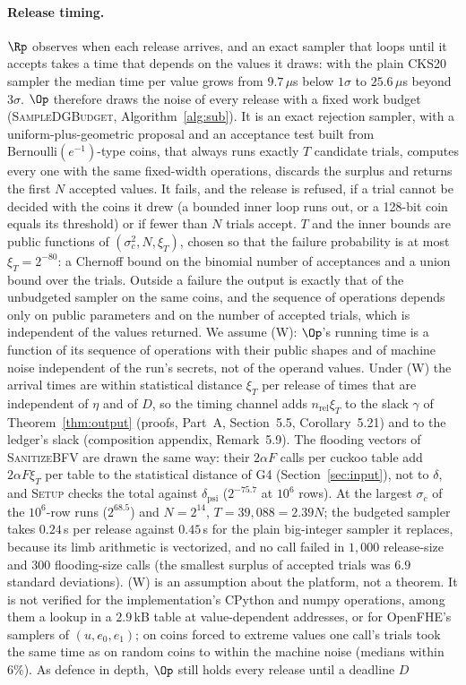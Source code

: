 \paragraph{Release timing.} $\Rp$ observes when each release arrives, and an exact sampler that loops until it accepts takes a time that depends on the values it draws: with the plain CKS20 sampler the median time per value grows from $9.7\,\mu$s below $1\sigma$ to $25.6\,\mu$s beyond $3\sigma$. $\Op$ therefore draws the noise of every release with a fixed work budget (\textsc{SampleDGBudget}, Algorithm~\ref{alg:sub}). It is an exact rejection sampler, with a uniform-plus-geometric proposal and an acceptance test built from $\mathrm{Bernoulli}(e^{-1})$-type coins, that always runs exactly $T$ candidate trials, computes every one with the same fixed-width operations, discards the surplus and returns the first $N$ accepted values. It fails, and the release is refused, if a trial cannot be decided with the coins it drew (a bounded inner loop runs out, or a 128-bit coin equals its threshold) or if fewer than $N$ trials accept. $T$ and the inner bounds are public functions of $(\sigma_c^2, N, \xi_T)$, chosen so that the failure probability is at most $\xi_T = 2^{-80}$: a Chernoff bound on the binomial number of acceptances and a union bound over the trials. Outside a failure the output is exactly that of the unbudgeted sampler on the same coins, and the sequence of operations depends only on public parameters and on the number of accepted trials, which is independent of the values returned. We assume (W): $\Op$'s running time is a function of its sequence of operations with their public shapes and of machine noise independent of the run's secrets, not of the operand values. Under (W) the arrival times are within statistical distance $\xi_T$ per release of times that are independent of $\eta$ and of $D$, so the timing channel adds $n_{\mathrm{rel}}\xi_T$ to the slack $\gamma$ of Theorem~\ref{thm:output} (proofs, Part~A, Section~5.5, Corollary~5.21) and to the ledger's slack (composition appendix, Remark~5.9). The flooding vectors of \textsc{SanitizeBFV} are drawn the same way: their $2\alpha F$ calls per cuckoo table add $2\alpha F\xi_T$ per table to the statistical distance of G4 (Section~\ref{sec:input}), not to $\delta$, and \textsc{Setup} checks the total against $\delta_{\mathrm{psi}}$ ($2^{-75.7}$ at $10^6$ rows). At the largest $\sigma_c$ of the $10^6$-row runs ($2^{68.5}$) and $N = 2^{14}$, $T = 39{,}088 = 2.39N$; the budgeted sampler takes $0.24$\,s per release against $0.45$\,s for the plain big-integer sampler it replaces, because its limb arithmetic is vectorized, and no call failed in $1{,}000$ release-size and $300$ flooding-size calls (the smallest surplus of accepted trials was $6.9$ standard deviations). (W) is an assumption about the platform, not a theorem. It is not verified for the implementation's CPython and numpy operations, among them a lookup in a $2.9$\,kB table at value-dependent addresses, or for OpenFHE's samplers of $(u, e_0, e_1)$; on coins forced to extreme values one call's trials took the same time as on random coins to within the machine noise (medians within $6\%$). As defence in depth, $\Op$ still holds every release until a deadline $D$ 